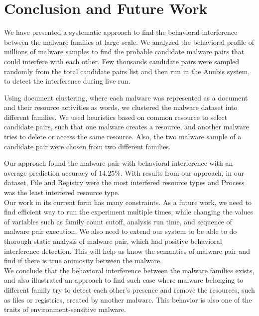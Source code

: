 \chapter{Conclusion and Future Work}\label{chapter:conclusion_and_future_work}
We have presented a systematic approach to find the behavioral interference between the malware families at large scale.
We analyzed the behavioral profile of millions of malware samples to find the probable candidate malware pairs that could interfere with each other.
Few thousands candidate pairs were sampled randomly from the total candidate pairs list and then run in the Anubis system, to detect the interference during live run.

Using document clustering, where each malware was represented as a document and their resource activities as words, we clustered the malware dataset into different families.
We used heuristics based on common resource to select candidate pairs, such that one malware creates a resource, and another malware tries to delete or access the same resource.
Also, the two malware sample of a candidate pair were chosen from two different families.

Our approach found the malware pair with behavioral interference with an average prediction accuracy of $14.25\%$.
With results from our approach, in our dataset, File and Registry were the most interfered resource types and Process was the least interfered resource type.\\

Our work in its current form has many constraints.
As a future work, we need to find efficient way to run the experiment multiple times, while changing the values of variables such as family count cutoff, analysis run time, and sequence of malware pair execution.
We also need to extend our system to be able to do thorough static analysis of malware pair, which had positive behavioral interference detection.
This will help us know the semantics of malware pair and find if there is true animosity between the malware.\\

We conclude that the behavioral interference between the malware families exists, and also illustrated an approach to find such case where malware belonging to different family try to detect each other's presence and remove the resources, such as files or registries, created by another malware.
This behavior is also one of the traits of environment-sensitive malware.
